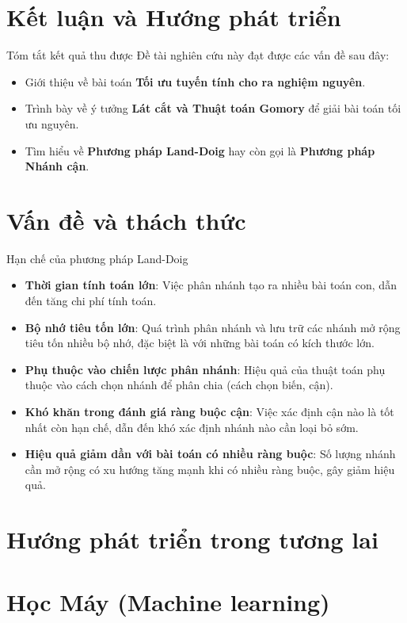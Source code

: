 \documentclass[10pt]{beamer}
\begin{document}
\section{Kết luận và Hướng phát triển}
\begin{frame}{Tóm tắt kết quả thu được}
Đề tài nghiên cứu này đạt được các vấn đề sau đây:
\bigskip
\begin{itemize}
    \item Giới thiệu về bài toán \textbf{Tối ưu tuyến tính cho ra nghiệm nguyên}.
    \medskip
    \item Trình bày về ý tưởng \textbf{Lát cắt và Thuật toán Gomory} để giải bài toán tối ưu nguyên.
    \medskip
	\item Tìm hiểu về \textbf{Phương pháp Land-Doig} hay còn gọi là \textbf{Phương pháp Nhánh cận}.
\end{itemize}
\end{frame}
\section*{Vấn đề và thách thức}
\begin{frame}{Hạn chế của phương pháp Land-Doig}
\begin{itemize}
    \item<1-> \textbf{Thời gian tính toán lớn}: Việc phân nhánh tạo ra nhiều bài toán con, dẫn đến tăng chi phí tính toán.
    \item<2-> \textbf{Bộ nhớ tiêu tốn lớn}: Quá trình phân nhánh và lưu trữ các nhánh mở rộng tiêu tốn nhiều bộ nhớ, đặc biệt là với những bài toán có kích thước lớn.
    \item<3-> \textbf{Phụ thuộc vào chiến lược phân nhánh}: Hiệu quả của thuật toán phụ thuộc vào cách chọn nhánh để phân chia (cách chọn biến, cận).
    \item<4-> \textbf{Khó khăn trong đánh giá ràng buộc cận}: Việc xác định cận nào là tốt nhất còn hạn chế, dẫn đến khó xác định nhánh nào cần loại bỏ sớm.
    \item<5-> \textbf{Hiệu quả giảm dần với bài toán có nhiều ràng buộc}: Số lượng nhánh cần mở rộng có xu hướng tăng mạnh khi có nhiều ràng buộc, gây giảm hiệu quả.
\end{itemize}
\end{frame}

\section*{Hướng phát triển trong tương lai}
\section*{Học Máy (Machine learning)}
\end{document}
